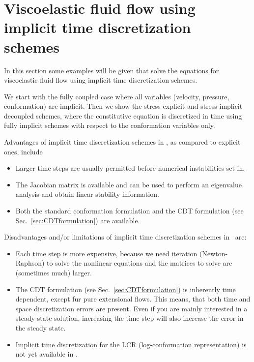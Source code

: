 
\def\headdate{11th May 2025}

\section{Viscoelastic fluid flow using implicit time discretization schemes}
\label{sec:implicit}

In this section some examples will be given that solve the equations 
for viscoelastic fluid flow using implicit time discretization schemes.

We start with the fully coupled case where
all variables (velocity, pressure, conformation) are implicit.
Then we show the stress-explicit and stress-implicit decoupled schemes, where
the constitutive equation is discretized in time using fully implicit schemes
with respect to the conformation variables only.

Advantages of implicit time discretization schemes in \tfem, as compared to explicit ones, include
\begin{itemize}
  \item Larger time steps are usually permitted before numerical instabilities set in.
  \item The Jacobian matrix is available and can be used to perform
      an eigenvalue analysis and obtain linear stability information.
  \item Both the standard conformation formulation and the CDT formulation (see Sec.~\ref{sec:CDTformulation}) are available. 
\end{itemize}
Disadvantages and/or limitations of implicit time discretization schemes in \tfem\ are:
\begin{itemize}
  \item Each time step is more expensive, because we need iteration (Newton-Raphson) to solve the
nonlinear equations and the matrices to solve are (sometimes much) larger.
  \item The CDT formulation (see Sec.~\ref{sec:CDTformulation}) is inherently time dependent, except fur pure extensional flows. This means, that both time and space discretization errors are present. Even if you are mainly interested in a steady state solution, increasing the time step will also increase the error in the steady state.
  \item Implicit time discretization for the LCR (log-conformation representation) is not yet available in \tfem.
\end{itemize}

